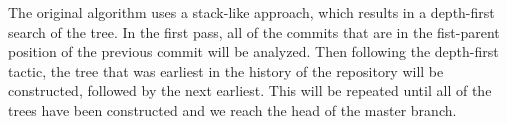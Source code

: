 The original algorithm uses a stack-like approach, which results in a depth-first
search of the tree. In the first pass, all of the commits that are in the
fist-parent position of the previous commit will be analyzed. Then following the
depth-first tactic, the tree that was earliest in the history of the repository will
be constructed, followed by the next earliest. This will be repeated until all of
the trees have been constructed and we reach the head of the master branch.


